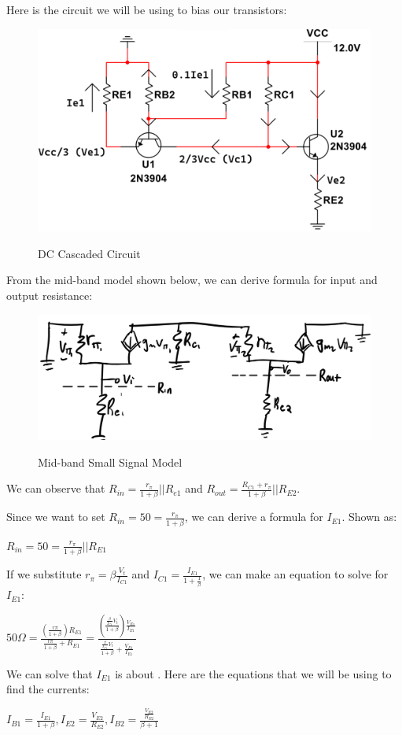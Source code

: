 \documentclass[12pt]{article}
\begin{document}
Here is the circuit we will be using to bias our transistors:

\begin{figure}[h!]
\centering
\includegraphics[height=0.25\textwidth]{Images/part_2_bias.png}\\
\caption{DC Cascaded Circuit}
\label{fig:1/4rulecircuit}
\end{figure}
\FloatBarrier

From the mid-band model shown below, we can derive formula for input and output resistance:
\begin{figure}[h!]
\centering
\includegraphics[height=0.15\textwidth]{Images/part_2_midband.png}\\
\caption{Mid-band Small Signal Model}
\label{fig:1/4rulecircuit}
\end{figure}

We can observe that $R_{in}=\frac{r_\pi}{1+\beta}||R_{e1}$ and $R_{out} = \frac{R_{C1}+r_\pi}{1+\beta}||R_{E2}$.


Since we want to set $R_{in}=50=\frac{r_\pi}{1+\beta}$, we can derive a formula for $I_{E1}$. Shown as: 
\begin{center}
$R_{in}=50=\frac{r_\pi}{1+\beta}||R_{E1}$
\end{center}
If we substitute $r_\pi = \beta \frac{V_t}{I_{C1}}$ and $I_{C1} = \frac{I_{E1}}{1+\frac{1}{\beta}}$, we can make an equation to solve for $I_{E1}$:
\begin{center}
$50\Omega = \frac{(\frac{r\pi}{1+\beta})R_{E1}}{\frac{r\pi}{1+\beta}+R_{E1}} =  \frac{(\frac{\frac{\beta}{I_{C1}}V_t}{1+\beta})\frac{V_{E1}}{I_{E1}}}{\frac{\frac{\beta}{I_{C1}}V_t}{1+\beta}+\frac{V_{E1}}{I_{E1}}}$ 

\end{center}
 We can solve that $I_{E1}$ is about .
\newline
Here are the equations that we will be using to find the currents:
\begin{center}
$I_{B1} = \frac{I_{E1}}{1+\beta}, 
I_{E2} = \frac{V_{E2}}{R_{E2}},    
I_{B2} = \frac{\frac{V_{E2}}{R_{E2}}}{\beta +1}$
\end{center}
\end{document}
